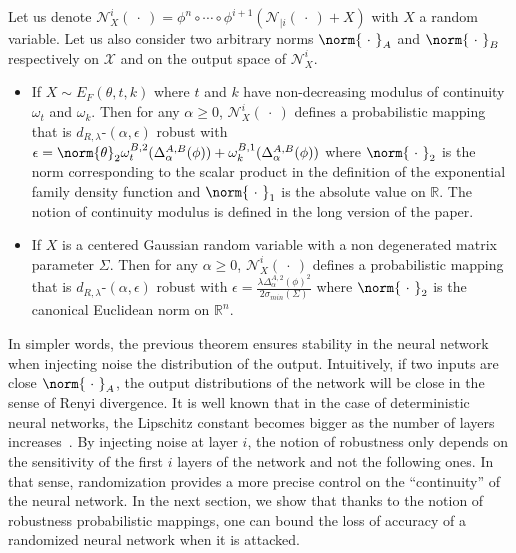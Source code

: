 \begin{theorem} \label{theorem:ap3-netrob}
  Let us denote $\mathcal{N}_{X}^i(\ \cdot\ ) = \phi^n\circ \cdots \circ\phi^{i+1}(\mathcal{N}_{|i}(\ \cdot\ )+X)$ with $X$ a random variable.
  Let us also consider two arbitrary norms $\norm{\ \cdot\ }_{A}$ and $\norm{\ \cdot\ }_{B}$  respectively on $\mathcal{X}$ and on the output space of $\mathcal{N}_{X}^i$.
  \begin{itemize}
    \item If $X\sim E_{F}(\theta,t,k)$ where $t$ and $k$ have non-decreasing modulus of continuity $\omega_t$ and $\omega_k$.
    Then for any $\alpha \geq 0$, $\mathcal{N}_{X}^i(\ \cdot\ )$ defines a probabilistic mapping that is $d_{R,\lambda}$-$(\alpha,\epsilon)$ robust with $\epsilon = \norm{\theta}_2 \omega^{B,2}_t(\Delta^{A,B}_{\alpha}(\phi)) +\omega_k^{B,1}(\Delta^{A,B}_{\alpha}(\phi)) $ where $\norm{\ \cdot\ }_2$ is the norm corresponding to the scalar product in the definition of the exponential family density function and $\norm{\ \cdot\ }_1$ is the absolute value on $\mathbb{R}$.
    The notion of continuity modulus is defined in the long version of the paper.
    \item If $X$ is a centered Gaussian random variable with a non degenerated matrix parameter $\Sigma$.
      Then for any $\alpha \geq 0$, $\mathcal{N}_{X}^i(\ \cdot\ )$ defines a probabilistic mapping that is $d_{R,\lambda}$-$(\alpha,\epsilon)$ robust with $ \epsilon = \frac{\lambda \Delta^{A,2}_{\alpha}(\phi)^2 }{2 \sigma_{min}(\Sigma) } $ where $\norm{\ \cdot\ }_2$ is the canonical Euclidean norm on $\mathbb{R}^n$.
  \end{itemize}
  \removespace
\end{theorem}

In simpler words, the previous theorem ensures stability in the neural network when injecting noise \wrt the distribution of the output.
Intuitively, if two inputs are close \wrt $\norm{\ \cdot\ }_{A}$, the output distributions of the network will be close in the sense of Renyi divergence.
It is well known that in the case of deterministic neural networks, the Lipschitz constant becomes bigger as the number of layers increases~\cite{gouk2018regularisation}.
By injecting noise at layer $i$, the notion of robustness only depends on the sensitivity of the first $i$ layers of the network and not the following ones.
In that sense, randomization provides a more precise control on the ``continuity'' of the neural network.
In the next section, we show that thanks to the notion of robustness \wrt probabilistic mappings, one can bound the loss of accuracy of a randomized neural network when it is attacked. 

